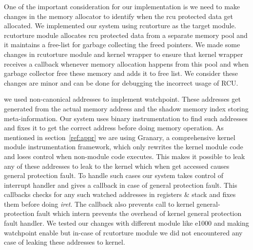 One of the important consideration for our implementation is we need to make changes in the memory allocator to identify when the rcu protected data get allocated. We implemented our system using rcutorture as the target module. rcutorture module allocates rcu protected data from a separate memory pool and it maintains a free-list for garbage collecting the freed pointers. We made some changes in rcutorture module and kernel wrapper to ensure that kernel wrapper receives a callback whenever memory allocation happens from this pool and when garbage collector free these memory and adds it to free list. We consider these changes are minor and can be done for debugging the incorrect usage of RCU. 

we used non-canonical addresses to implement watchpoint. These addresses get generated from the actual memory address and the shadow memory index storing meta-information. Our system uses binary instrumentation to find such addresses and fixes it to get the correct address before doing memory operation. As mentioned in section~\ref{ref:appr} we are using Granary, a comprehensive kernel module instrumentation framework, which only rewrites the kernel module code and loses control when non-module code executes. This makes it possible to leak any of these addresses to leak to the kernel which when get accessed causes general protection fault. To handle such cases our system takes control of interrupt handler and gives a callback in case of general protection fault. This callbacks checks for any such watched addresses in registers \& stack and fixes them before doing \emph{iret}. The callback also prevents call to kernel general-protection fault which intern  prevents the overhead of kernel general protection fault handler. We tested our changes with different module like e1000 and making watchpoint enable but in-case of rcutorture module we did not encountered any case of leaking these addresses to kernel.
